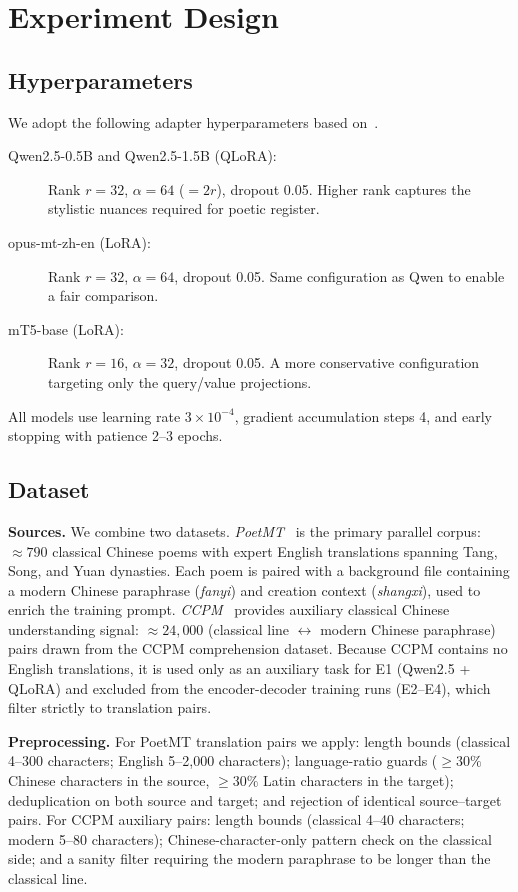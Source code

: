 \section{Experiment Design}\label{sec:expdesign}
\subsection{Hyperparameters}
We adopt the following adapter hyperparameters based on~\cite{dettmers2023qlora}.

\begin{description}
    \item[Qwen2.5-0.5B and Qwen2.5-1.5B (QLoRA):] Rank $r=32$, $\alpha=64$ ($=2r$), dropout 0.05. Higher rank captures the stylistic nuances required for poetic register.
    \item[opus-mt-zh-en (LoRA):] Rank $r=32$, $\alpha=64$, dropout 0.05. Same configuration as Qwen to enable a fair comparison.
    \item[mT5-base (LoRA):] Rank $r=16$, $\alpha=32$, dropout 0.05. A more conservative configuration targeting only the query/value projections.
\end{description}

All models use learning rate $3\times10^{-4}$, gradient accumulation steps 4, and early stopping with patience 2--3 epochs.

\subsection{Dataset}

\textbf{Sources.} We combine two datasets.
\emph{PoetMT}~\cite{chen2025benchmarking} is the primary parallel corpus: ${\approx}790$ classical Chinese poems with expert English translations spanning Tang, Song, and Yuan dynasties. Each poem is paired with a background file containing a modern Chinese paraphrase (\textit{fanyi}) and creation context (\textit{shangxi}), used to enrich the training prompt.
\emph{CCPM}~\cite{li2021ccpm} provides auxiliary classical Chinese understanding signal: ${\approx}24{,}000$ (classical line $\leftrightarrow$ modern Chinese paraphrase) pairs drawn from the CCPM comprehension dataset. Because CCPM contains no English translations, it is used only as an auxiliary task for E1 (Qwen2.5 + QLoRA) and excluded from the encoder-decoder training runs (E2--E4), which filter strictly to translation pairs.

\textbf{Preprocessing.} For PoetMT translation pairs we apply: length bounds (classical 4--300 characters; English 5--2{,}000 characters); language-ratio guards ($\geq30\%$ Chinese characters in the source, $\geq30\%$ Latin characters in the target); deduplication on both source and target; and rejection of identical source--target pairs. For CCPM auxiliary pairs: length bounds (classical 4--40 characters; modern 5--80 characters); Chinese-character-only pattern check on the classical side; and a sanity filter requiring the modern paraphrase to be longer than the classical line.

